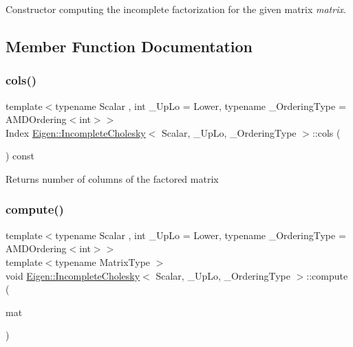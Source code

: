 Constructor computing the incomplete factorization for the given matrix {\itshape matrix}. 

\subsection{Member Function Documentation}
\mbox{\label{class_eigen_1_1_incomplete_cholesky_a0d66a1c8e340617e7ff404e63186fedb}} 
\subsubsection{\texorpdfstring{cols()}{cols()}}
{\footnotesize\ttfamily template$<$typename Scalar , int \+\_\+\+Up\+Lo = Lower, typename \+\_\+\+Ordering\+Type  = A\+M\+D\+Ordering$<$int$>$$>$ \\
Index \mbox{\hyperlink{class_eigen_1_1_incomplete_cholesky}{Eigen\+::\+Incomplete\+Cholesky}}$<$ Scalar, \+\_\+\+Up\+Lo, \+\_\+\+Ordering\+Type $>$\+::cols (\begin{DoxyParamCaption}\item[{void}]{ }\end{DoxyParamCaption}) const\hspace{0.3cm}{\ttfamily [inline]}}

\begin{DoxyReturn}{Returns}
number of columns of the factored matrix 
\end{DoxyReturn}
\mbox{\label{class_eigen_1_1_incomplete_cholesky_a7966bedeebbeaa7a8fe4dd1da3797a0b}} 
\subsubsection{\texorpdfstring{compute()}{compute()}}
{\footnotesize\ttfamily template$<$typename Scalar , int \+\_\+\+Up\+Lo = Lower, typename \+\_\+\+Ordering\+Type  = A\+M\+D\+Ordering$<$int$>$$>$ \\
template$<$typename Matrix\+Type $>$ \\
void \mbox{\hyperlink{class_eigen_1_1_incomplete_cholesky}{Eigen\+::\+Incomplete\+Cholesky}}$<$ Scalar, \+\_\+\+Up\+Lo, \+\_\+\+Ordering\+Type $>$\+::compute (\begin{DoxyParamCaption}\item[{const Matrix\+Type \&}]{mat }\end{DoxyParamCaption})\hspace{0.3cm}{\ttfamily [inline]}}

